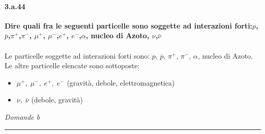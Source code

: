 \documentclass[twoside]{article}
\begin{document}
\paragraph{3.a.44}\textbf{Dire quali fra le seguenti particelle sono soggette ad interazioni forti:$p$,$\overline{p}$,$\pi^+$,$\pi^-$, $\mu^+$, $\mu^-$,$e^+$, $e^-$,$\alpha$, nucleo di Azoto, $\nu$,$\bar{\nu}$}\\
\\
Le particelle soggette ad interazioni forti sono: $p$, $\overline{p}$, $\pi^+$, $\pi^-$, $\alpha$, nucleo di Azoto. 
\\
Le altre particelle elencate sono sottoposte:
\begin{itemize}
\item $\mu^+, \; \mu^-, \; e^+, \; e^-$ (gravità, debole, elettromagnetica)
\item $\nu, \; \bar{\nu}$ (debole, gravità)
\end{itemize}


\textit{Domande b}\rule{13.7 cm}{0.4pt}
\end{document}
